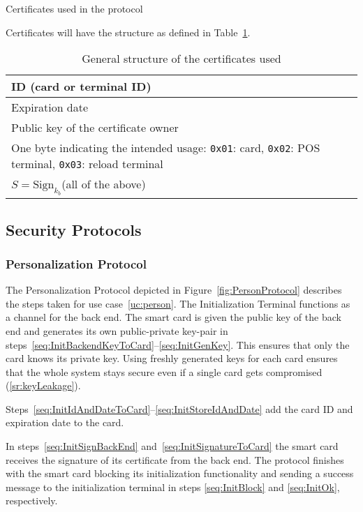 \documentclass{article}
\begin{document}
\begin{table}[h!]
    \centering
    
    \caption{Certificates used in the protocol}
    \label{tab:certs}
\end{table}

Certificates will have the structure as defined in Table~\ref{tab:certStructure}.
\begin{table}[h!]
    \centering
    \begin{tabular}{|p{8cm}|}
    \hline
        ID (card or terminal ID) \\
    \hline
        Expiration date \\
    \hline
        Public key of the certificate owner \\
    \hline
        One byte indicating the intended usage: \texttt{0x01}: card, \texttt{0x02}: POS terminal, \texttt{0x03}: reload terminal \\
    \hline
        $S = \textrm{Sign}_{k_b}$(all of the above) \\
    \hline
    \end{tabular}
    \caption{General structure of the certificates used}
    \label{tab:certStructure}
\end{table}

\subsection{Security Protocols}
\subsubsection{Personalization Protocol} \label{sec:perProtocol}
The Personalization Protocol depicted in Figure~\ref{fig:PersonProtocol} describes the steps taken for use case~\ref{uc:person}.
The Initialization Terminal functions as a channel for the back end. 
The smart card is given the public key of the back end and generates its own public-private key-pair in steps~\ref{seq:InitBackendKeyToCard}--\ref{seq:InitGenKey}.
This ensures that only the card knows its private key.
Using freshly generated keys for each card ensures that the whole system stays secure even if a single card gets compromised (\ref{sr:keyLeakage}).

Steps~\ref{seq:InitIdAndDateToCard}--\ref{seq:InitStoreIdAndDate} add the card ID and expiration date to the card.

In steps~\ref{seq:InitSignBackEnd} and~\ref{seq:InitSignatureToCard} the smart card receives the signature of its certificate from the back end.
The protocol finishes with the smart card blocking its initialization functionality and sending a success message to the initialization terminal in steps \ref{seq:InitBlock} and \ref{seq:InitOk}, respectively.
\end{document}
